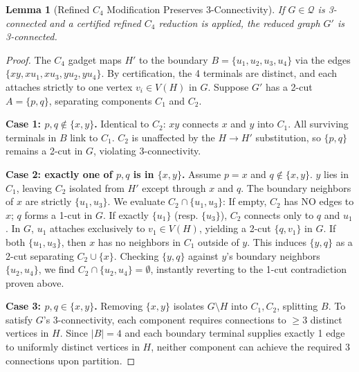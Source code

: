 \documentclass[12pt]{article}
\newtheorem{lemma}[theorem]{Lemma}
\begin{document}
\begin{lemma}[Refined $C_4$ Modification Preserves 3-Connectivity]
\label{lem:app-c4-3conn}
If $G \in \mathcal{Q}$ is 3-connected and a certified refined $C_4$ reduction is applied, the reduced graph $G'$ is 3-connected.
\end{lemma}
\begin{proof}
The $C_4$ gadget maps $H'$ to the boundary $B = \{u_1, u_2, u_3, u_4\}$ via the edges $\{xy, xu_1, xu_3, yu_2, yu_4\}$. By certification, the 4 terminals are distinct, and each attaches strictly to one vertex $v_i \in V(H)$ in $G$.
Suppose $G'$ has a 2-cut $A = \{p, q\}$, separating components $C_1$ and $C_2$.

\textbf{Case 1: $p, q \notin \{x, y\}$.}
Identical to $C_2$: $xy$ connects $x$ and $y$ into $C_1$. All surviving terminals in $B$ link to $C_1$. $C_2$ is unaffected by the $H \to H'$ substitution, so $\{p, q\}$ remains a 2-cut in $G$, violating 3-connectivity.

\textbf{Case 2: exactly one of $p, q$ is in $\{x, y\}$.}
Assume $p = x$ and $q \notin \{x, y\}$. $y$ lies in $C_1$, leaving $C_2$ isolated from $H'$ except through $x$ and $q$.
The boundary neighbors of $x$ are strictly $\{u_1, u_3\}$. We evaluate $C_2 \cap \{u_1, u_3\}$:
If empty, $C_2$ has NO edges to $x$; $q$ forms a 1-cut in $G$.
If exactly $\{u_1\}$ (resp. $\{u_3\}$), $C_2$ connects only to $q$ and $u_1$. In $G$, $u_1$ attaches exclusively to $v_1 \in V(H)$, yielding a 2-cut $\{q, v_1\}$ in $G$.
If both $\{u_1, u_3\}$, then $x$ has no neighbors in $C_1$ outside of $y$. This induces $\{y, q\}$ as a 2-cut separating $C_2 \cup \{x\}$. Checking $\{y, q\}$ against $y$'s boundary neighbors $\{u_2, u_4\}$, we find $C_2 \cap \{u_2, u_4\} = \emptyset$, instantly reverting to the 1-cut contradiction proven above.

\textbf{Case 3: $p, q \in \{x, y\}$.}
Removing $\{x, y\}$ isolates $G \setminus H$ into $C_1, C_2$, splitting $B$.
To satisfy $G$'s 3-connectivity, each component requires connections to $\ge 3$ distinct vertices in $H$. Since $|B|=4$ and each boundary terminal supplies exactly 1 edge to uniformly distinct vertices in $H$, neither component can achieve the required 3 connections upon partition.
\end{proof}
\end{document}
